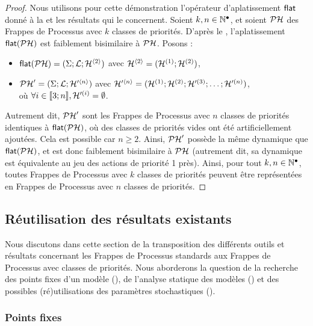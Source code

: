\begin{proof}
  Nous utilisons pour cette démonstration
  l'opérateur d'aplatissement $\mathsf{flat}$ donné à la 
  et les résultats qui le concernent.
  Soient $k, n \in \mathbb{N}^\bullet$,
  et soient $\mathcal{PH}$ des Frappes de Processus avec $k$ classes de priorités.
  D'après le ,
  l'aplatissement $\mathsf{flat}(\mathcal{PH})$ est faiblement bisimilaire à $\mathcal{PH}$.
  Posons :
  \begin{itemize}
    \item $\mathsf{flat}(\mathcal{PH}) = (\Sigma; \mathcal{L}; \mathcal{H}^{{\langle 2 \rangle}})$
      avec $\mathcal{H}^{{\langle 2 \rangle}} = (\mathcal{H}^{(1)}; \mathcal{H}^{(2)})$,
    \item $\mathcal{PH}' = (\Sigma; \mathcal{L}; \mathcal{H}'^{{\langle n \rangle}})$
      avec $\mathcal{H}'^{{\langle n \rangle}} = (\mathcal{H}^{(1)}; \mathcal{H}^{(2)}; \mathcal{H}'^{(3)}; \ldots; \mathcal{H}'^{(n)})$, \\
      \hspace*{1em} où $\forall i \in \mathopen{\llbracket}3\mathclose{};n\mathclose{\rrbracket}, \mathcal{H}'^{(i)} = \emptyset$.
  \end{itemize}
  Autrement dit, $\mathcal{PH}'$ sont les Frappes de Processus avec $n$ classes de priorités
  identiques à $\mathsf{flat}(\mathcal{PH})$, où des classes de priorités vides ont été
  artificiellement ajoutées.
  Cela est possible car $n \geq 2$.
  Ainsi, $\mathcal{PH}'$ possède la même dynamique que $\mathsf{flat}(\mathcal{PH})$,
  et est donc faiblement bisimilaire à $\mathcal{PH}$
  (autrement dit, sa dynamique est équivalente au jeu des actions de priorité 1 près).
  Ainsi, pour tout $k, n \in \mathbb{N}^\bullet$,
  toutes Frappes de Processus avec $k$ classes de priorités peuvent être représentées
  en Frappes de Processus avec $n$ classes de priorités.
\end{proof}



\subsection{Réutilisation des résultats existants}

Nous discutons dans cette section de la transposition des différents outils et
résultats concernant les Frappes de Processus standards
aux Frappes de Processus avec classes de priorités.
Nous aborderons la question de la recherche des points fixes d'un modèle (),
de l'analyse statique des modèles ()
et des possibles (ré)utilisations des paramètres stochastiques ().

\subsubsection{Points fixes}

